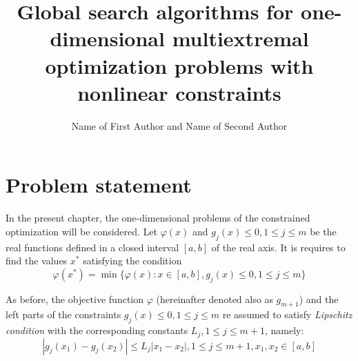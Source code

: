 \documentclass[graybox]{svmult}
\begin{document}
\title{Global search algorithms for one-dimensional multiextremal optimization problems with nonlinear constraints}
\author{Name of First Author and Name of Second Author}
%
%
\maketitle



\section{Problem statement}
In the present chapter, the one-dimensional problems of the constrained optimization will
be considered. Let $\varphi(x)$ and $g_j(x)\le 0,1\le j\le m$ be the real functions defined in a closed interval $[a,b]$ of the real axis. It is requires to find the values $x^*$ satisfying the condition
\begin{equation}
  \label{eq4:problem}
  \varphi(x^*)=\min\{\varphi(x):x\in [a,b], g_j(x)\le 0,1\le j\le m\}
\end{equation}

As before, the objective function $\varphi$ (hereinafter denoted also as $g_{m+1}$) and the left parts of the constraints $g_j(x)\le 0,1\le j\le m$ re assumed to satisfy \emph{Lipschitz condition} with the corresponding constants $L_j,1\le j\le m+1$, namely:
\begin{equation}
  \label{eq4:lip_condition}
  |g_j(x_1)-g_j(x_2)|\le L_j|x_1-x_2|,1\le j\le m+1,x_1,x_2\in [a,b]
\end{equation}
\end{document}

